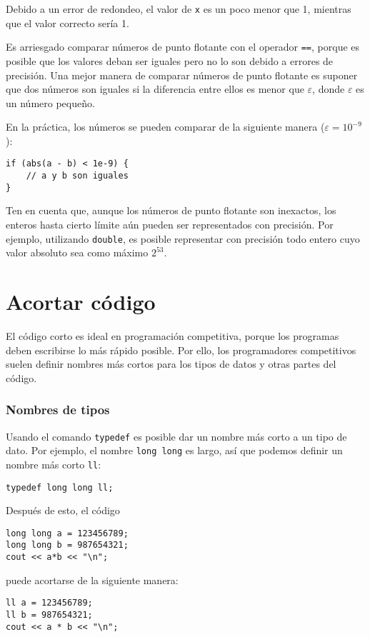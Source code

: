 Debido a un error de redondeo,
el valor de \texttt{x} es un poco menor que 1,
mientras que el valor correcto sería 1.

Es arriesgado comparar números de punto flotante
con el operador \texttt{==},
porque es posible que los valores deban ser
iguales pero no lo son debido a errores de precisión.
Una mejor manera de comparar números de punto flotante
es suponer que dos números son iguales
si la diferencia entre ellos es menor que $\varepsilon$,
donde $\varepsilon$ es un número pequeño.

En la práctica, los números se pueden comparar
de la siguiente manera ($\varepsilon=10^{-9}$):

\begin{lstlisting}
if (abs(a - b) < 1e-9) {
    // a y b son iguales
}
\end{lstlisting}

Ten en cuenta que, aunque los números de punto flotante son inexactos,
los enteros hasta cierto límite aún pueden ser
representados con precisión.
Por ejemplo, utilizando \texttt{double},
es posible representar con precisión todo
entero cuyo valor absoluto sea como máximo $2^{53}$.

\section{Acortar código}

El código corto es ideal en programación competitiva,
porque los programas deben escribirse
lo más rápido posible.
Por ello, los programadores competitivos suelen definir
nombres más cortos para los tipos de datos y otras partes del código.

\subsubsection{Nombres de tipos}
Usando el comando \texttt{typedef}
es posible dar un nombre más corto
a un tipo de dato.
Por ejemplo, el nombre \texttt{long long} es largo,
así que podemos definir un nombre más corto \texttt{ll}:
\begin{lstlisting}
typedef long long ll;
\end{lstlisting}
Después de esto, el código
\begin{lstlisting}
long long a = 123456789;
long long b = 987654321;
cout << a*b << "\n";
\end{lstlisting}
puede acortarse de la siguiente manera:
\begin{lstlisting}
ll a = 123456789;
ll b = 987654321;
cout << a * b << "\n";
\end{lstlisting}

